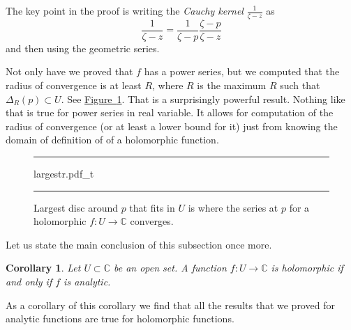 \documentclass[12pt,openany]{book}
\newcommand{\C}{{\mathbb{C}}}
\newcommand{\myindex}[1]{#1\index{#1}}
\theoremstyle{plain}
\newtheorem{cor}[thm]{Corollary}
\theoremstyle{remark}
\theoremstyle{definition}
\newenvironment{myfig}{%
\begin{figure}[h!t]
\noindent\rule{\textwidth}{0.4pt}\vspace{12pt}\par\centering}%
{\par\noindent\rule{\textwidth}{0.4pt}
\end{figure}}
\theoremstyle{exercise}
\theoremstyle{example}
\newcommand{\figureref}[1]{\hyperref[#1]{Figure~\ref*{#1}}}
\begin{document}
The key point in the proof is writing the \emph{\myindex{Cauchy kernel}}
$\frac{1}{\zeta-z}$ as
\begin{equation*}
\frac{1}{\zeta-z}
=
\frac{1}{\zeta-p}
\frac{\zeta-p}{\zeta-z}
\end{equation*}
and then using the geometric series.

Not only have we proved
that $f$ has a power series, but we computed
that the radius of convergence is at least $R$, where $R$ is the maximum $R$
such that $\Delta_R(p) \subset U$.  See \figureref{fig:largestr}.
That is a surprisingly powerful result.
Nothing like that is true for power series in real variable.
It allows for computation of the radius of convergence (or at least a lower
bound for it) just from knowing the 
domain of definition of of a holomorphic function.

\begin{myfig}
{largestr.pdf_t}
\caption{Largest disc around $p$ that fits in $U$
is where the series at $p$
for a holomorphic $f \colon U \to \C$ converges.%
\label{fig:largestr}}
\end{myfig}

Let us state the main conclusion of this subsection once more.

\begin{cor}
Let $U \subset \C$ be an open set.  A function $f \colon U \to \C$
is holomorphic if and only if $f$ is analytic.
\end{cor}

As a corollary of this corollary we find that all the results that we proved
for analytic functions are true for holomorphic functions.
\end{document}
